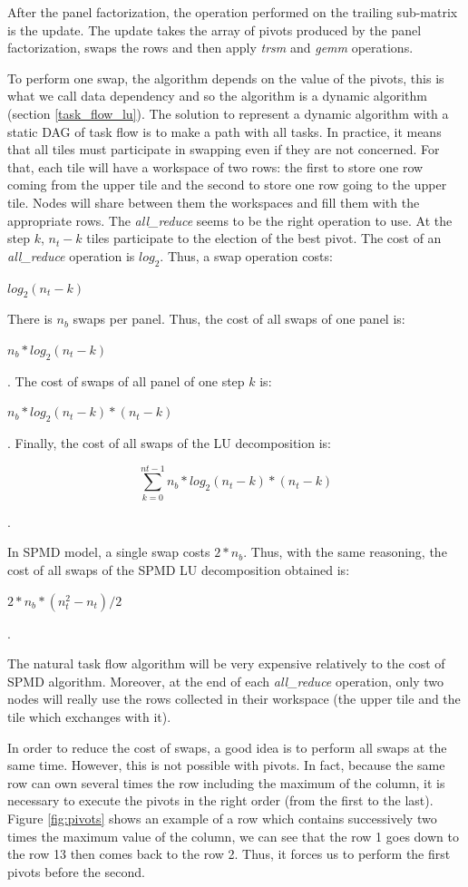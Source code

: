 After the panel factorization, the operation performed on the trailing sub-matrix is the update. The update takes the array of pivots produced by the panel factorization, swaps the rows and then apply \emph{trsm} and \emph{gemm} operations.

To perform one swap, the algorithm depends on the value of the pivots, this is what we call data dependency and so the algorithm is a dynamic algorithm (section \ref{task_flow_lu}). The solution to represent a dynamic algorithm with a static DAG of task flow is to make a path with all tasks. In practice, it means that all tiles must participate in swapping even if they are not concerned.
For that, each tile will have a workspace of two rows: the first to store one row coming from the upper tile and the second to store one row going to the upper tile. Nodes will share between them the workspaces and fill them with the appropriate rows.
The \emph{all\_reduce} seems to be the right operation to use. 
At the step $k$, $n_t-k$ tiles participate to the election of the best pivot. The cost of an \emph{all\_reduce} operation is $log_2$. Thus, a swap operation costs:
\begin{center}
$log_2(n_t-k)$
\end{center}
There is $n_b$ swaps per panel. Thus, the cost of all swaps of one panel is:
\begin{center}
$n_b*log_2(n_t-k)$
\end{center}.
The cost of swaps of all panel of one step $k$ is:
\begin{center}
$n_b*log_2(n_t-k)*(n_t-k)$
\end{center}.
Finally, the cost of all swaps of the LU decomposition is:
\begin{center}
$$\sum_{k=0}^{nt-1} n_b*log_2(n_t-k)*(n_t-k)$$
\end{center}.

In SPMD model, a single swap costs $2*n_b$. Thus, with the same reasoning, the cost of all swaps of the SPMD LU decomposition obtained is:
\begin{center}
$2*n_b*(n_t^2-n_t)/2$
\end{center}.

The natural task flow algorithm will be very expensive relatively to the cost of SPMD algorithm. Moreover, at the end of each \emph{all\_reduce} operation, only two nodes will really use the rows collected in their workspace (the upper tile and the tile which exchanges with it).

In order to reduce the cost of swaps, a good idea is to perform all swaps at the same time. However, this is not possible with pivots. In fact, because the same row can own several times the row including the maximum of the column, it is necessary to execute the pivots in the right order (from the first to the last). Figure \ref{fig:pivots} shows an example of a row which contains successively two times the maximum value of the column, we can see that the row 1 goes down to the row 13 then comes back to the row 2. Thus, it forces us to perform the first pivots before the second.

